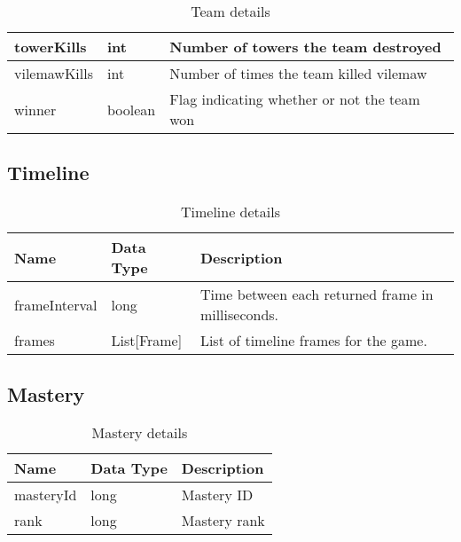 \begin{table}[!htb]
\begin{tabular}{|llp{5cm}|}
towerKills           & int                      & Number of towers the team destroyed                                                        \\ \hline
vilemawKills         & int                      & Number of times the team killed vilemaw                                                    \\ \hline
winner               & boolean                  & Flag indicating whether or not the team won                                                \\ \hline
\end{tabular}
\caption{Team details}\label{tab:team}
\end{table}

\FloatBarrier
\subsection{Timeline}
\begin{table}[!htb]
\footnotesize
\centering
\begin{tabular}{|llp{5cm}|}
\hline
\textbf{Name} & \textbf{Data Type} & \textbf{Description}                              \\ \hline
frameInterval & long               & Time between each returned frame in milliseconds. \\ \hline
frames        & List{[}Frame{]}    & List of timeline frames for the game.             \\ \hline
\end{tabular}
\caption{Timeline details}\label{tab:time}
\end{table}

\FloatBarrier
\subsection{Mastery}
\begin{table}[!htb]
\footnotesize
\centering
\begin{tabular}{|llp{5cm}|}
\hline
\textbf{Name} & \textbf{Data Type} & \textbf{Description} \\ \hline
masteryId & long & Mastery ID \\ \hline
rank & long & Mastery rank \\ \hline
\end{tabular}
\caption{Mastery details}\label{tab:mastery}
\end{table}

